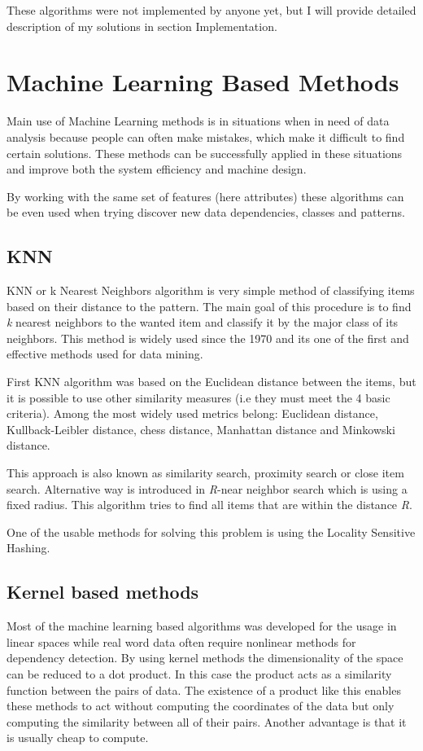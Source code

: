 These algorithms were not implemented by anyone yet, but I will provide detailed description of my solutions in section Implementation.

\section{Machine Learning Based Methods}
Main use of Machine Learning methods is in situations when in need of data analysis because people can often make mistakes, which make it difficult to find certain solutions.
These methods can be successfully applied in these situations and improve both the system efficiency and machine design. 

By working with the same set of features (here attributes) these algorithms can be even used when trying discover new data dependencies, classes and patterns. \cite{mlbm}
\subsection{KNN}
KNN or k Nearest Neighbors algorithm is very simple method of classifying items based on their distance to the pattern. The main goal of this procedure is to find \textit{k} nearest neighbors to the wanted item and classify it by the major class of its neighbors. This method is widely used since the 1970 and its one of the first and effective methods used for data mining.

First KNN algorithm was based on the Euclidean distance between the items, but it is possible to use other similarity measures (i.e they must meet the 4 basic criteria). Among the most widely used metrics belong: Euclidean distance, Kullback-Leibler distance, chess distance, Manhattan distance and Minkowski distance.

This approach is also known as similarity search, proximity search or close item search. Alternative way is introduced in \textit{R}-near neighbor search which is using a fixed radius. This algorithm tries to find all items that are within the distance \textit{R}. \cite{hashing}

One of the usable methods for solving this problem is using the Locality Sensitive Hashing.

\subsection{Kernel based methods}
Most of the machine learning based algorithms was developed for the usage in linear spaces while real word data often require nonlinear methods for dependency detection. By using kernel methods the dimensionality of the space can be reduced to a dot product. In this case the product acts as a similarity function between the pairs of data. The existence of a product like this enables these methods to act without computing the coordinates of the data but only computing the similarity between all of their pairs. Another advantage is that it is usually cheap to compute.

